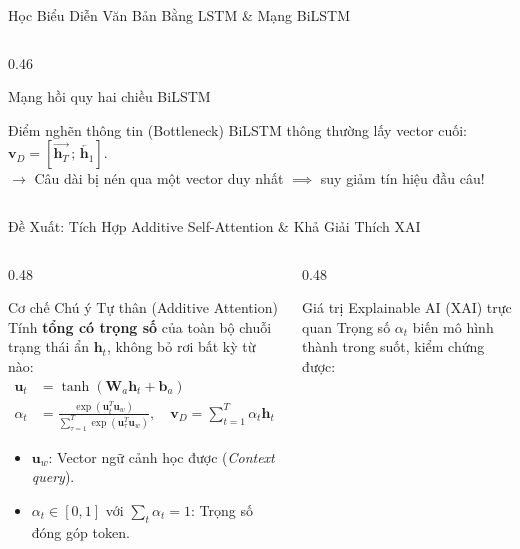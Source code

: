 \documentclass[aspectratio=169, 10pt]{beamer}
\begin{document}
\begin{frame}{Học Biểu Diễn Văn Bản Bằng LSTM \& Mạng BiLSTM}
\begin{columns}[T, onlytextwidth]
\begin{column}{0.46\textwidth}
\begin{block}{Mạng hồi quy hai chiều BiLSTM}
      \end{block}
      \vspace{0.15cm}
      \begin{alertblock}{Điểm nghẽn thông tin (Bottleneck)}
        \fontsize{7.5}{9.5}\selectfont
        BiLSTM thông thường lấy vector cuối: $\mathbf{v}_D = [\overrightarrow{\mathbf{h}_T} \,;\, \overleftarrow{\mathbf{h}_1}]$.\\
        $\to$ Câu dài bị nén qua một vector duy nhất $\implies$ suy giảm tín hiệu đầu câu!
      \end{alertblock}
    \end{column}
  \end{columns}
\end{frame}

\begin{frame}{Đề Xuất: Tích Hợp Additive Self-Attention \& Khả Giải Thích XAI}
  \begin{columns}[T, onlytextwidth]
    \begin{column}{0.48\textwidth}
      \begin{block}{Cơ chế Chú ý Tự thân (Additive Attention)}
        \fontsize{7.5}{9.5}\selectfont
        Tính \textbf{tổng có trọng số} của toàn bộ chuỗi trạng thái ẩn $\mathbf{h}_t$, không bỏ rơi bất kỳ từ nào:
        \begin{align*}
          \mathbf{u}_t &= \tanh(\mathbf{W}_a \mathbf{h}_t + \mathbf{b}_a) \\
          \displaystyle \alpha_t &= \frac{\exp(\mathbf{u}_t^T \mathbf{u}_w)}{\sum_{\tau=1}^T \exp(\mathbf{u}_\tau^T \mathbf{u}_w)}, \quad \mathbf{v}_D = \sum_{t=1}^T \alpha_t \mathbf{h}_t
        \end{align*}
        \begin{itemize}\setlength{\itemsep}{0.15em}
          \item $\mathbf{u}_w$: Vector ngữ cảnh học được (\textit{Context query}).
          \item $\alpha_t \in [0, 1]$ với $\sum_t \alpha_t = 1$: Trọng số đóng góp token.
        \end{itemize}
      \end{block}
    \end{column}
    \hfill
    \begin{column}{0.48\textwidth}
      \begin{exampleblock}{Giá trị Explainable AI (XAI) trực quan}
        \fontsize{7.5}{9.5}\selectfont
        Trọng số $\alpha_t$ biến mô hình thành trong suốt, kiểm chứng được:
        \vspace{0.1cm}


\end{exampleblock}
\end{column}
\end{columns}
\end{frame}
\end{document}
